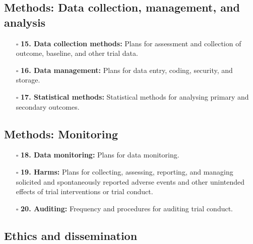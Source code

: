 \documentclass[11pt]{article}
\def\tightlist{}
\begin{document}
\begin{Form}
\subsection{Methods: Data collection, management, and
analysis}\label{methods-data-collection-management-and-analysis}

\begin{itemize}
\tightlist
\item[$\square$]
  \textbf{15. Data collection methods:} Plans for assessment and
  collection of outcome, baseline, and other trial data.
\item[$\square$]
  \textbf{16. Data management:} Plans for data entry, coding, security,
  and storage.
\item[$\square$]
  \textbf{17. Statistical methods:} Statistical methods for analysing
  primary and secondary outcomes.
\end{itemize}

\subsection{Methods: Monitoring}\label{methods-monitoring}

\begin{itemize}
\tightlist
\item[$\square$]
  \textbf{18. Data monitoring:} Plans for data monitoring.
\item[$\square$]
  \textbf{19. Harms:} Plans for collecting, assessing, reporting, and
  managing solicited and spontaneously reported adverse events and other
  unintended effects of trial interventions or trial conduct.
\item[$\square$]
  \textbf{20. Auditing:} Frequency and procedures for auditing trial
  conduct.
\end{itemize}

\subsection{Ethics and dissemination}\label{ethics-and-dissemination}


\end{Form}
\end{document}
